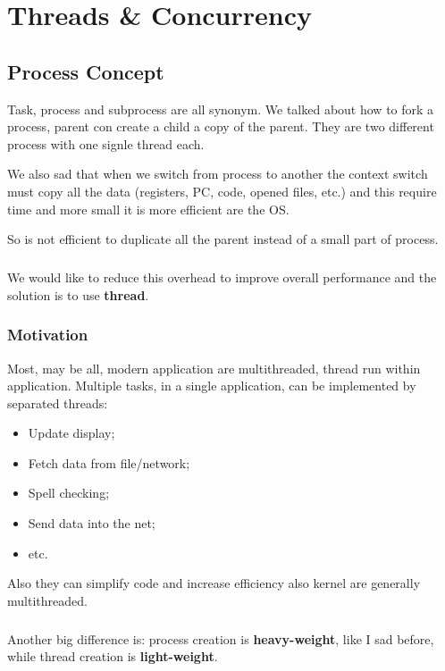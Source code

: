 \chapter{Threads \& Concurrency}

\section{Process Concept}

Task, process and subprocess are all synonym. We talked about how to fork a process, parent con create a child a copy of the parent. They are two different process with one signle thread each.

We also sad that when we switch from process to another the context switch must copy all the data (registers, PC, code, opened files, etc.) and this require time and more small it is more efficient are the OS.

So is not efficient to duplicate all the parent instead of a small part of process.
\paragraph{}
We would like to reduce this overhead to improve overall performance and the solution is to use \textbf{thread}. 

\subsection{Motivation}

Most, may be all, modern application are multithreaded, thread run within application. Multiple tasks, in a single application, can be implemented by separated threads:
\begin{itemize}
    \item Update display;
    \item Fetch data from file/network;
    \item Spell checking;
    \item Send data into the net;
    \item etc.
\end{itemize}

Also they can simplify code and increase efficiency also kernel are generally multithreaded.
\paragraph{}
Another big difference is: process creation is \textbf{heavy-weight}, like I sad before, while thread creation is \textbf{light-weight}.

